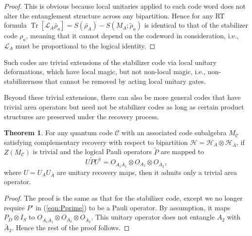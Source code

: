 \documentclass[%
 reprint,
superscriptaddress,
nofootinbib,
 amsmath,amssymb,
 aps,
prx,
floatfix,
]{revtex4-2}
\theoremstyle{definition}
\newtheorem{theorem}{Theorem}[section]
\numberwithin{equation}{section}
\DeclareMathOperator{\Tr}{Tr}
\begin{document}
\begin{proof}
    This is obvious because local unitaries applied to each code word does not alter the entanglement structure across any bipartition. Hence for any RT formula $\Tr[\mathcal{L}_A\tilde{\rho_a}]= S(\tilde{\rho_A})-S(M_A;\tilde{\rho}_a)$ is identical to that of the stabilizer code $\rho_a$, meaning that it cannot depend on the codeword in consideration, i.e., $\mathcal{L}_A$ must be proportional to the logical identity.
\end{proof}

Such codes are trivial extensions of the stabilizer code via local unitary deformations, which have local magic, but not non-local magic, i.e., non-stabilizerness that cannot be removed by acting local unitary gates.

Beyond these trivial extensions, there can also be more general codes that have trivial area operators but need not be stabilizer codes as long as certain product structures are preserved under the recovery process. 



\begin{theorem}\label{thm:2}
   For any quantum code $\mathcal{C}$ with an associated code subalgebra $M_{\mathcal{C}}$ satisfying complementary recovery with respect to bipartition $\mathcal{H}=\mathcal{H}_A\otimes\mathcal{H}_{\bar{A}}$,  if $Z(M_{\mathcal{C}})$ is trivial and the logical Pauli operators $\tilde{P}$ are mapped to 
$$U\tilde{P}U^{\dagger}=O_{A_1\bar{A}_1}\otimes O_{A_2}\otimes O_{\bar{A}_2},$$
where $U=U_AU_{\bar{A}}$ are unitary recovery maps, then it admits only a trivial area operator.
\end{theorem}


\begin{proof}
The proof is the same as that for the stabilizer code, except we no longer require $P'$ in (\ref{eqn:Pprime}) to be a Pauli operator. By assumption, it maps $P_{D}\otimes I_{S}$ to $O_{A_1\bar{A}_1}\otimes O_{A_2}\otimes O_{\bar{A}_2}$. This unitary operator does not entangle $A_2$ with $\bar{A}_2$. Hence the rest of the proof follows.  
\end{proof}
\end{document}
